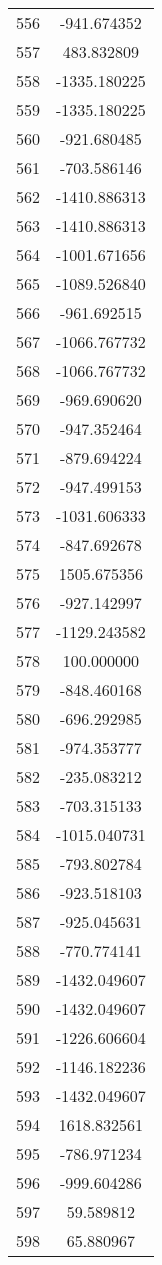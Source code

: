 \documentclass[12pt]{article}
\begin{document}
\begin{longtable}{@{}cc@{}}
556 & -941.674352 \\
557 & 483.832809 \\
558 & -1335.180225 \\
559 & -1335.180225 \\
560 & -921.680485 \\
561 & -703.586146 \\
562 & -1410.886313 \\
563 & -1410.886313 \\
564 & -1001.671656 \\
565 & -1089.526840 \\
566 & -961.692515 \\
567 & -1066.767732 \\
568 & -1066.767732 \\
569 & -969.690620 \\
570 & -947.352464 \\
571 & -879.694224 \\
572 & -947.499153 \\
573 & -1031.606333 \\
574 & -847.692678 \\
575 & 1505.675356 \\
576 & -927.142997 \\
577 & -1129.243582 \\
578 & 100.000000 \\
579 & -848.460168 \\
580 & -696.292985 \\
581 & -974.353777 \\
582 & -235.083212 \\
583 & -703.315133 \\
584 & -1015.040731 \\
585 & -793.802784 \\
586 & -923.518103 \\
587 & -925.045631 \\
588 & -770.774141 \\
589 & -1432.049607 \\
590 & -1432.049607 \\
591 & -1226.606604 \\
592 & -1146.182236 \\
593 & -1432.049607 \\
594 & 1618.832561 \\
595 & -786.971234 \\
596 & -999.604286 \\
597 & 59.589812 \\
598 & 65.880967 \\

\end{longtable}
\end{document}
